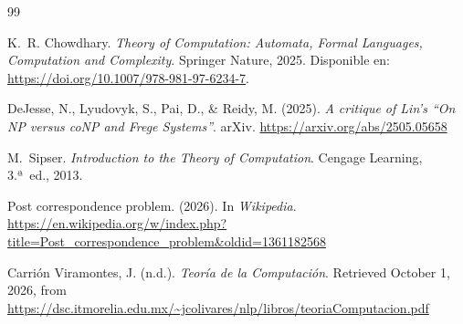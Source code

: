 
\begin{thebibliography}{99}

K.~R. Chowdhary.
\newblock \emph{Theory of Computation: Automata, Formal Languages, Computation and Complexity}.
\newblock Springer Nature, 2025.
\newblock Disponible en: \url{https://doi.org/10.1007/978-981-97-6234-7}.

DeJesse, N., Lyudovyk, S., Pai, D., \& Reidy, M. (2025).
\newblock \emph{A critique of Lin's ``On NP versus coNP and Frege Systems''}.
\newblock arXiv.
\newblock \url{https://arxiv.org/abs/2505.05658}

M.~Sipser.
\newblock \emph{Introduction to the Theory of Computation}.
\newblock Cengage Learning, 3.ª~ed., 2013.

Post correspondence problem. (2026). In \textit{Wikipedia}. \url{https://en.wikipedia.org/w/index.php?title=Post_correspondence_problem&oldid=1361182568}

Carri\'on Viramontes, J. (n.d.). \textit{Teor\'ia de la Computaci\'on}. Retrieved October 1, 2026, from \url{https://dsc.itmorelia.edu.mx/~jcolivares/nlp/libros/teoriaComputacion.pdf}
\end{thebibliography}
